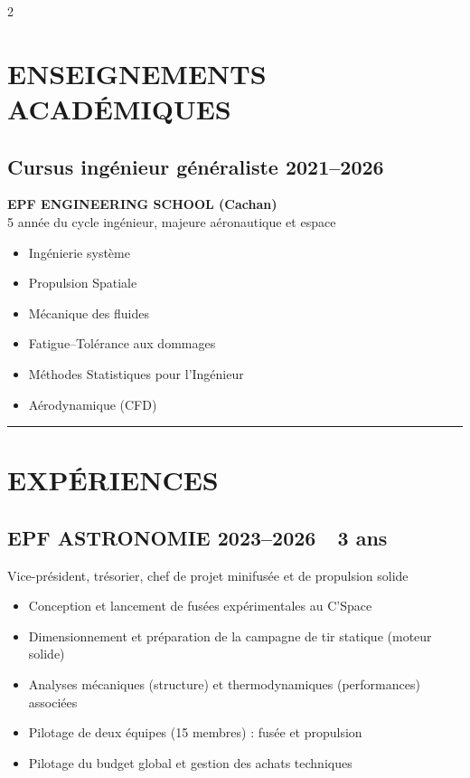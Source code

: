 \documentclass[10pt,a4paper]{article}
\newcommand{\datetag}[1]{\hfill{\small\bfseries #1}}
\begin{document}
\begin{paracol}{2}
\switchcolumn

\section{ENSEIGNEMENTS ACADÉMIQUES}
\subsection{Cursus ingénieur généraliste \datetag{2021--2026}}
\textbf{EPF ENGINEERING SCHOOL (Cachan)}\\
5\ieme{} année du cycle ingénieur, majeure aéronautique et espace

\vspace{2pt}
\begin{minipage}[t]{0.46\linewidth}
    \begin{itemize}
        \item Ingénierie système
        \item Propulsion Spatiale
        \item Mécanique des fluides
    \end{itemize}
\end{minipage}\hfill
\begin{minipage}[t]{0.5\linewidth}
    \begin{itemize}
        \item Fatigue--Tolérance aux dommages
        \item Méthodes Statistiques pour l'Ingénieur
        \item Aérodynamique (CFD)
    \end{itemize}
\end{minipage}

\vspace{4pt}
\hrule
\vspace{4pt}

\section{EXPÉRIENCES}

\begin{minipage}[t]{0.53\linewidth}
    \subsection{EPF ASTRONOMIE \datetag{2023--2026\ \ 3 ans}}
    Vice-président, trésorier, chef de projet minifusée et de propulsion solide
    \begin{itemize}
        \item Conception et lancement de fusées expérimentales au C'Space
        \item Dimensionnement et préparation de la campagne de tir statique
              (moteur solide)
        \item Analyses mécaniques (structure) et thermodynamiques
              (performances) associées
        \item Pilotage de deux équipes (15 membres) : fusée et propulsion
        \item Pilotage du budget global et gestion des achats techniques
    \end{itemize}


\end{minipage}
\end{paracol}
\end{document}
